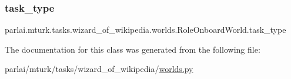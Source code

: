 \subsubsection{\texorpdfstring{task\+\_\+type}{task\_type}}
{\footnotesize\ttfamily parlai.\+mturk.\+tasks.\+wizard\+\_\+of\+\_\+wikipedia.\+worlds.\+Role\+Onboard\+World.\+task\+\_\+type}



The documentation for this class was generated from the following file\+:\begin{DoxyCompactItemize}
\item 
parlai/mturk/tasks/wizard\+\_\+of\+\_\+wikipedia/\hyperlink{parlai_2mturk_2tasks_2wizard__of__wikipedia_2worlds_8py}{worlds.\+py}\end{DoxyCompactItemize}
